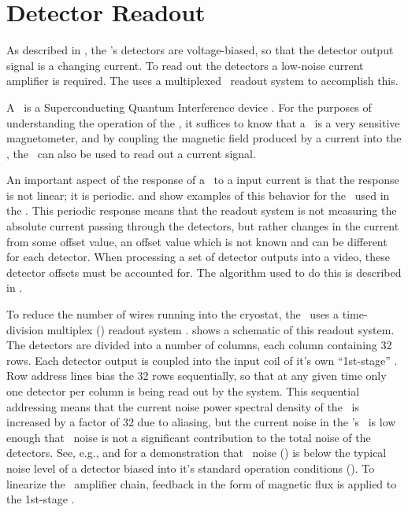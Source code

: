 \section{Detector Readout} \label{sec:det-readout}

As described in , the \Imager's detectors are voltage-biased, so that the detector output signal is a changing current.
To read out the detectors a low-noise current amplifier is required.
The \Imager uses a multiplexed \SQUID\ readout system to accomplish this.

A \SQUID\ is a Superconducting Quantum Interference device \cite{clarke_squid_2002}.
For the purposes of understanding the operation of the \Imager, it suffices to know that a \SQUID\ is a very sensitive magnetometer, and by coupling the magnetic field produced by a current into the \SQUID, the \SQUID\ can also be used to read out a current signal.

An important aspect of the response of a \SQUID\ to a input current is that the response is not linear; it is periodic.
 and  show examples of this behavior for the \SQUIDs\ used in the \Imager.
This periodic response means that the readout system is not measuring the absolute current passing through the detectors, but rather changes in the current from some offset value, an offset value which is not known and can be different for each detector.
When processing a set of detector outputs into a video, these detector offsets must be accounted for.
The algorithm used to do this is described in .

To reduce the number of wires running into the cryostat, the \Imager\ uses a time-division multiplex (\TDM) readout system \cite{chervenak_superconducting_1999,korte_time-division_2003,reintsema_prototype_2003}.
 shows a schematic of this readout system.
The detectors are divided into a number of columns, each column containing 32 rows.
Each detector output is coupled into the input coil of it's own ``1st-stage'' \SQUID.
Row address lines bias the 32 rows sequentially, so that at any given time only one detector per column is being read out by the system.
This sequential addressing means that the current noise power spectral density of the \SQUIDs\ is increased by a factor of 32 due to aliasing, but the current noise in the \Imager's \SQUIDs\ is low enough that \SQUID\ noise is not a significant contribution to the total noise of the detectors.
See, e.g.,  and  for a demonstration that \SQUID\ noise () is below the typical noise level of a detector biased into it's standard operation conditions ().
To linearize the \SQUID\ amplifier chain, feedback in the form of magnetic flux is applied to the 1st-stage \SQUIDs.

